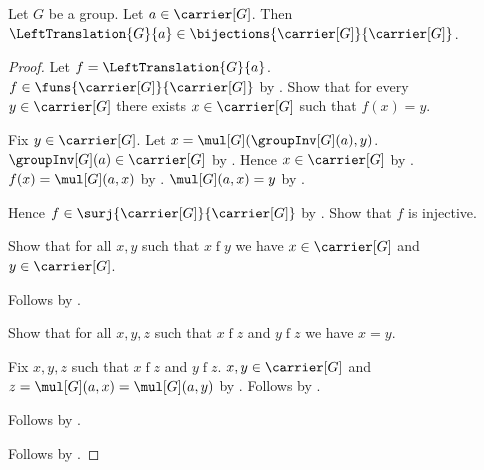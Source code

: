 \begin{theorem}\label{left_translation_bijection}
    Let $G$ be a group.
    Let $a\in\carrier[G]$.
    Then $\LeftTranslation{G}{a}\in
        \bijections{\carrier[G]}{\carrier[G]}$.
\end{theorem}
\begin{proof}
    Let $f=\LeftTranslation{G}{a}$.
    $f\in\funs{\carrier[G]}{\carrier[G]}$
        by .
    Show that for every $y\in\carrier[G]$ there exists
        $x\in\carrier[G]$ such that $f(x)=y$.
    \begin{subproof}
        Fix $y\in\carrier[G]$.
        Let $x=\mul[G](\groupInv[G](a),y)$.
        $\groupInv[G](a)\in\carrier[G]$
            by .
        Hence $x\in\carrier[G]$
            by .
        $f(x)=\mul[G](a,x)$
            by .
        $\mul[G](a,x)=y$ by .
    \end{subproof}
    Hence $f\in\surj{\carrier[G]}{\carrier[G]}$
        by .
    Show that $f$ is injective.
    \begin{subproof}
        Show that for all $x,y$ such that $x\mathrel{f}y$ we have
            $x\in\carrier[G]$ and $y\in\carrier[G]$.
        \begin{subproof}
            Follows by .
        \end{subproof}
        Show that for all $x,y,z$ such that $x\mathrel{f}z$ and
            $y\mathrel{f}z$ we have $x=y$.
        \begin{subproof}
            Fix $x,y,z$ such that $x\mathrel{f}z$ and $y\mathrel{f}z$.
            $x,y\in\carrier[G]$ and
                $z=\mul[G](a,x)=\mul[G](a,y)$
                by .
            Follows by .
        \end{subproof}
        Follows by .
    \end{subproof}
    Follows by .
\end{proof}

